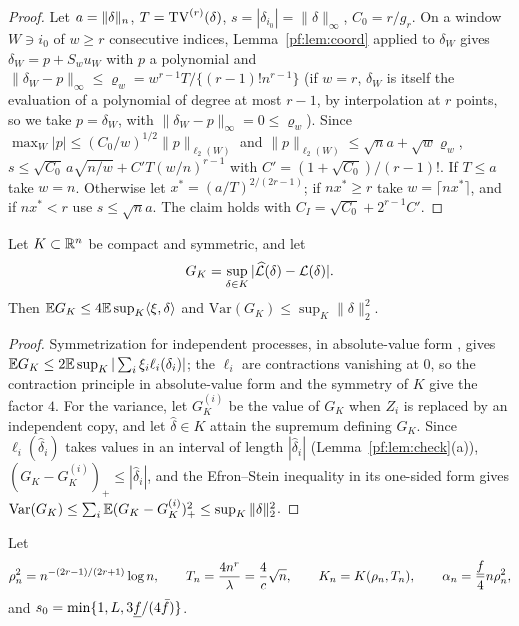 \begin{proof}
Let $a=\|\delta\|_n$, $T=\mathrm{TV}^{(r)}(\delta)$, $s=|\delta_{i_0}|=\|\delta\|_\infty$, $C_0=r/g_r$. On a window $W\ni i_0$ of $w\ge r$ consecutive indices, Lemma~\ref{pf:lem:coord} applied to $\delta_W$ gives $\delta_W=p+S_wu_W$ with $p$ a polynomial and $\|\delta_W-p\|_\infty\le\varrho_w=w^{r-1}T/\{(r-1)!n^{r-1}\}$ (if $w=r$, $\delta_W$ is itself the evaluation of a polynomial of degree at most $r-1$, by interpolation at $r$ points, so we take $p=\delta_W$, with $\|\delta_W-p\|_\infty=0\le\varrho_w$). Since $\max_W|p|\le(C_0/w)^{1/2}\|p\|_{\ell_2(W)}$ and $\|p\|_{\ell_2(W)}\le\sqrt na+\sqrt w\varrho_w$,
$s\le\sqrt{C_0}\,a\sqrt{n/w}+C'T(w/n)^{r-1}$ with $C'=(1+\sqrt{C_0})/(r-1)!$. If $T\le a$ take $w=n$. Otherwise let $x^{*}=(a/T)^{2/(2r-1)}$; if $nx^{*}\ge r$ take $w=\lceil nx^{*}\rceil$, and if $nx^{*}<r$ use $s\le\sqrt na$. The claim holds with $C_I=\sqrt{C_0}+2^{r-1}C'$.
\end{proof}

\begin{lemma}[concentration]\label{pf:lem:conc}
Let $K\subset\mathbb{R}^n$ be compact and symmetric, and let
\[
G_K=\sup_{\delta\in K}|\widehat{\mathcal L}(\delta)-\mathcal L(\delta)|.
\]
Then
$\mathbb{E} G_K\le4\mathbb{E}\sup_K\langle\xi,\delta\rangle$ and $\mathrm{Var}(G_K)\le\sup_K\|\delta\|_2^2$.
\end{lemma}

\begin{proof}
Symmetrization for independent processes, in absolute-value form \citep[Lemma~2.3.6]{vandervaart1996weak}, gives $\mathbb{E} G_K\le2\mathbb{E}\sup_K|\sum_i\xi_i\ell_i(\delta_i)|$; the $\ell_i$ are contractions vanishing at $0$, so the contraction principle in absolute-value form \citep[Theorem~4.12]{ledoux1991probability} and the symmetry of $K$ give the factor $4$. For the variance, let $G_K^{(i)}$ be the value of $G_K$ when $Z_i$ is replaced by an independent copy, and let $\hat\delta\in K$ attain the supremum defining $G_K$. Since $\ell_i(\hat\delta_i)$ takes values in an interval of length $|\hat\delta_i|$ (Lemma~\ref{pf:lem:check}(a)), $(G_K-G_K^{(i)})_+\le|\hat\delta_i|$, and the Efron--Stein inequality \citep{efron1981jackknife} in its one-sided form \citep[Theorem~3.1]{boucheron2013concentration} gives $\mathrm{Var}(G_K)\le\sum_i\mathbb{E}(G_K-G_K^{(i)})_+^2\le\sup_K\|\delta\|_2^2$.
\end{proof}

Let
\[
\rho_n^2=n^{-(2r-1)/(2r+1)}\log n,\qquad T_n=\frac{4n^r}{\lambda}=\frac4c\sqrt n,\qquad K_n=K(\rho_n,T_n),\qquad \alpha_n=\frac{\underline f}4n\rho_n^2,
\]
and $s_0=\min\{1,L,3\underline f/(4\bar f)\}$.

